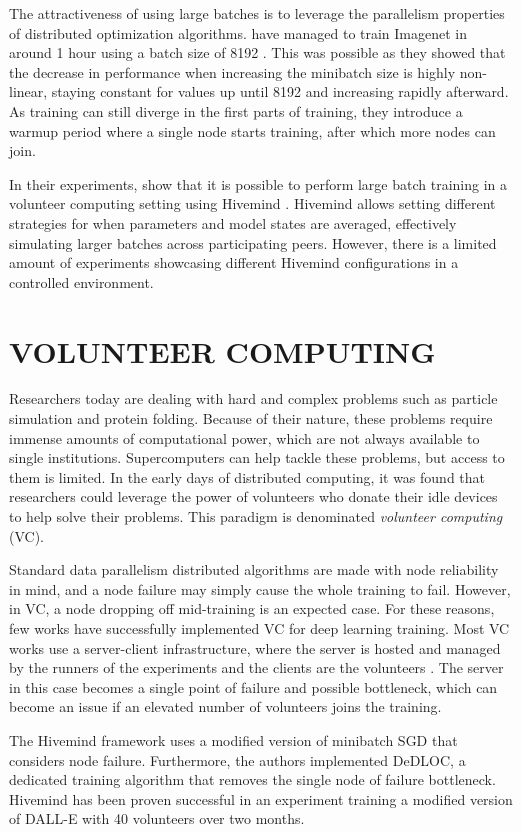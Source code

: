 The attractiveness of using large batches is to leverage the parallelism properties of distributed optimization algorithms.
\citeauthor{goyal2017accurate} have managed to train Imagenet in around 1 hour using a batch size of 8192 \cite{goyal2017accurate}.
This was possible as they showed that the decrease in performance when increasing the minibatch size is highly non-linear, staying constant for values up until 8192 and increasing rapidly afterward.
As training can still diverge in the first parts of training, they introduce a warmup period where a single node starts training, after which more nodes can join.

In their experiments, \citeauthor{ryabinin2020learning} show that it is possible to perform large batch training in a volunteer computing setting using Hivemind \cite{ryabinin2020learning, DBLP:journals/corr/abs-2106-10207}.
Hivemind allows setting different strategies for when parameters and model states are averaged, effectively simulating larger batches across participating peers.
However, there is a limited amount of experiments showcasing different Hivemind configurations in a controlled environment.

\section{VOLUNTEER COMPUTING}
Researchers today are dealing with hard and complex problems such as particle simulation and protein folding.
Because of their nature, these problems require immense amounts of computational power, which are not always available to single institutions.
Supercomputers can help tackle these problems, but access to them is limited.
In the early days of distributed computing, it was found that researchers could leverage the power of volunteers who donate their idle devices to help solve their problems.
This paradigm is denominated \textit{volunteer computing} (VC).

Standard data parallelism distributed algorithms are made with node reliability in mind, and a node failure may simply cause the whole training to fail.
However, in VC, a node dropping off mid-training is an expected case.
For these reasons, few works have successfully implemented VC for deep learning training.
Most VC works use a server-client infrastructure, where the server is hosted and managed by the runners of the experiments and the clients are the volunteers \cite{Atre_2021, 8886576}.
The server in this case becomes a single point of failure and possible bottleneck, which can become an issue if an elevated number of volunteers joins the training.

The Hivemind framework \cite{ryabinin2021mosphit} uses a modified version of minibatch SGD \cite{ryabinin2021mosphit} that considers node failure.
Furthermore, the authors implemented DeDLOC, a dedicated training algorithm \cite{DBLP:journals/corr/abs-2106-10207} that removes the single node of failure bottleneck.
Hivemind has been proven successful in an experiment training a modified version of DALL-E \cite{ramesh2021zero} with 40 volunteers over two months.
